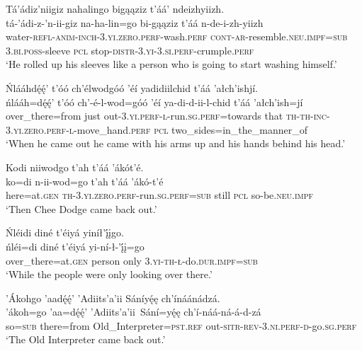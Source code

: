 \ea\label{ex:text1-66-7}
Tá’ádiz’niigiz nahalingo bigąąziz t’áá’ ndeizhyiizh.\\
\gll tá-’ádi-z-’n-ii-giz	na-ha-lin=go	bi-gąąziz	t’áá	n-de-i-zh-yiizh\\
     water-\textsc{refl}-\textsc{anim}-\textsc{inch}-3.\textsc{yi}.\textsc{zero}.\textsc{perf}-wash.\textsc{perf}	\textsc{cont}-\textsc{ar}-resemble.\textsc{neu}.\textsc{impf}=\textsc{sub}	3.\textsc{bi}.\textsc{poss}-sleeve	\textsc{pcl}	stop-\textsc{distr}-3.\textsc{yi}-3.\textsc{si}.\textsc{perf}-crumple.\textsc{perf}\\
\glt `He rolled up his sleeves like a person who is going to start washing himself.'
\z

\ea\label{ex:text1-66-8}
Ńlááhdę́ę́’ t’óó ch’élwodgóó ’éí yadidiilchid t’áá ’ałch’ishjí.\\
\gll ńlááh=dę́ę́’	t’óó	ch’-é-l-wod=góó	’éí	ya-di-d-ii-l-chid	t’áá	’ałch’ish=jí\\
     over\_there=from	just	out-3.\textsc{yi}.\textsc{perf}-\textsc{l}-run.\textsc{sg}.\textsc{perf}=towards	that	\textsc{th}-\textsc{th}-\textsc{inc}-3.\textsc{yi}.\textsc{zero}.\textsc{perf}-\textsc{l}-move\_hand.\textsc{perf}	\textsc{pcl}	two\_sides=in\_the\_manner\_of\\
\glt `When he came out he came with his arms up and his hands behind his head.'
\z

\ea\label{ex:text1-66-9}
Kodi niiwodgo t’ah t’áá ’ákót’é.\\
\gll ko=di	n-ii-wod=go	t’ah	t’áá	’ákó-t’é\\
     here=at.\textsc{gen}	\textsc{th}-3.\textsc{yi}.\textsc{zero}.\textsc{perf}-run.\textsc{sg}.\textsc{perf}=\textsc{sub}	still	\textsc{pcl}	so-be.\textsc{neu}.\textsc{impf}\\
\glt `Then Chee Dodge came back out.'
\z

\ea\label{ex:text1-66-10}
Ńléidi diné t’éiyá yiníł’į́įgo.\\
\gll ńléi=di	diné	t’éiyá	yi-ní-ł-’į́į=go\\
     over\_there=at.\textsc{gen}	person	only	3.\textsc{yi}-\textsc{th}-\textsc{ł}-do.\textsc{dur}.\textsc{impf}=\textsc{sub}\\
\glt `While the people were only looking over there.'
\z

\ea\label{ex:text1-66-11}
’Ákohgo ’aadę́ę́’ ’Adiits’a’ii Sáníyę́ę ch’ínáánádzá.\\
\gll ’ákoh=go	’aa=dę́ę́’	’Adiits’a’ii~{Sání=yę́ę}	ch’í-náá-ná-á-d-zá\\
     so=\textsc{sub}	there=from	Old\_Interpreter=\textsc{pst}.\textsc{ref}	out-\textsc{sitr}-\textsc{rev}-3.\textsc{ni}.\textsc{perf}-\textsc{d}-go.\textsc{sg}.\textsc{perf}\\
\glt `The Old Interpreter came back out.'
\z

